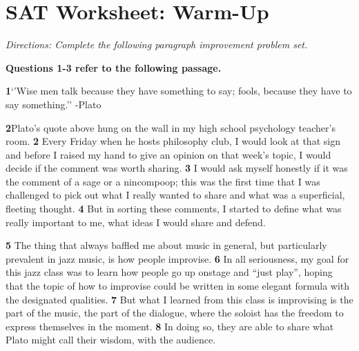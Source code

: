 \section{SAT Worksheet: Warm-Up}

\textit{Directions: Complete the following paragraph improvement problem set.}

\textbf{Questions 1-3 refer to the following passage.}

\textbf{1}`'Wise men talk because they have something to say; fools, because they have to say something.''  -Plato

\textbf{2}Plato’s quote above hung on the wall in my high school psychology teacher’s room. \textbf{2} Every Friday when he hosts philosophy club, I would look at that sign and before I raised my hand to give an opinion on that week’s topic, I would decide if the comment was worth sharing. \textbf{3} I would ask myself honestly if it was the comment of a sage or a nincompoop; this was the first time that I was challenged to pick out what I really wanted to share and what was a superficial, fleeting thought. \textbf{4} But in sorting these comments, I started to define what was really important to me, what ideas I would share and defend.

\textbf{5} The thing that always baffled me about music in general, but particularly prevalent in jazz music, is how people improvise. \textbf{6} In all seriousness, my goal for this jazz class was to learn how people go up onstage and ``just play'', hoping that the topic of how to improvise could be written in some elegant formula with the designated qualities. \textbf{7} But what I learned from this class is improvising is the part of the music, the part of the dialogue, where the soloist has the freedom to express themselves in the moment. \textbf{8} In doing so, they are able to share what Plato might call their wisdom, with the audience.

